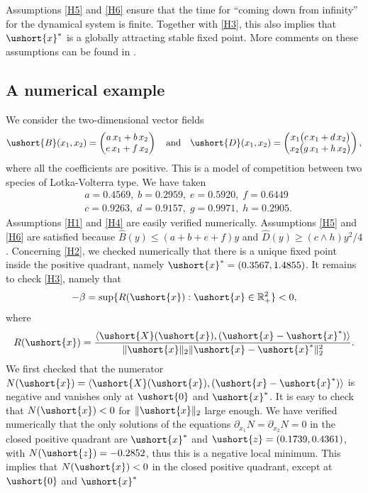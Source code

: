 \documentclass[JEP,XML,SOM,Unicode]{cedram}
\newcommand{\scaleto}[2]{#1}
\numberwithin{equation}{section}
\theoremstyle{plain}
\theoremstyle{definition}
\newcommand{\real}{\mathbb{R}}
\newcommand{\vecxf}{\ushort{x}^*}
\newcommand{\vecx}{\ushort{x}}
\newcommand{\vecz}{\ushort{z}}
\newcommand{\vecX}{\ushort{X}}
\newcommand{\vecB}{\ushort{B}}
\newcommand{\vecD}{\ushort{D}}
\newcommand{\veczer}{\ushort{0}}
\newcommand{\normdeux}[1]{\|#1\|_{2}}\let\snormdeux\normdeux
\begin{document}
Assumptions \eqref{H5} and \eqref{H6} ensure that the time for ``coming down from infinity'' for the
dynamical system is finite. Together with \eqref{H3}, this also implies that $\vecxf$ is a
globally attracting stable fixed point. More comments on these assumptions can be found in
\cite{ccm2}.

\subsection{A numerical example}

We consider the two-dimensional vector fields
\[
\vecB(x_1,x_{2})=
\begin{pmatrix}
a\,x_1+b\,x_{2}\\
e\,x_1+f\,x_{2}
\end{pmatrix}
\quad
\text{and}
\quad
\vecD(x_1,x_{2})=
\begin{pmatrix}
x_1\bigl(c\,x_1+d\,x_{2}\bigr)\\
x_{2}\bigl(g\,x_1+h\,x_{2}\bigr)
\end{pmatrix},
\]
where all the coefficients are positive. This is a model of competition between two species of Lotka-Volterra type.
We have taken
\begin{align*}
& a= 0.4569,\; b= 0.2959,\;e= 0.5920,\;f= 0.6449\\
& c= 0.9263,\;d= 0.9157,\;g= 0.9971,\;h= 0.2905.
\end{align*}
Assumptions \eqref{H1} and \eqref{H4} are easily verified numerically.
Assumptions \eqref{H5} and \eqref{H6} are satisfied because $\widehat{B}(y)\leq (a+b+e+f)y$ and
$\widehat{D}(y)\geq (c\wedge h)y^2/4$.
Concerning \eqref{H2}, we checked numerically that there is a unique fixed point inside the positive quadrant, namely
$\vecxf=(0.3567,1.4855)$.
It remains to check \eqref{H3}, namely that
\[
-\beta= \sup\{R(\vecx):\vecx \in \real_{\scaleto{+}{5pt}}^2\}<0,
\]
where
\[
R(\vecx)=\frac{\langle \vecX(\vecx),(\vecx-\vecxf)\rangle}{\normdeux{\vecx}\normdeux{\vecx-\vecxf}^{2}}.
\]
We first checked that the numerator $N(\vecx)=\langle\vecX(\vecx),(\vecx-\vecxf)\rangle$ is negative and vanishes only at
$\veczer$ and $\vecxf$. It is easy to check that $N(\vecx)<0$ for $\normdeux{\vecx}$ large enough. We have verified
numerically that the only solutions of the equations $\partial_{x_1}N=\partial_{x_2}N=0$ in the closed positive quadrant are
$\vecxf$ and $\vecz=(0.1739, 0.4361)$, with $N(\vecz)= -0.2852$, thus this is a negative local minimum.
This implies that $N(\vecx)<0$ in the closed positive quadrant, except at $\veczer$ and $\vecxf$
\end{document}
